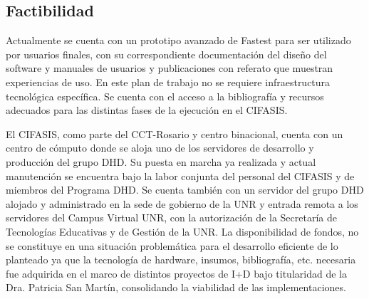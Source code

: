 \subsection{Factibilidad}
Actualmente se cuenta con un prototipo avanzado de Fastest para ser utilizado
por usuarios finales, con su correspondiente documentación del diseño del
software y  manuales de usuarios y publicaciones con referato que muestran
experiencias de uso. En este plan de trabajo no se requiere infraestructura
tecnológica específica. Se cuenta con  el acceso a la bibliografía y recursos
adecuados para las distintas fases de la ejecución en el CIFASIS.

El CIFASIS, como parte del CCT-Rosario y centro binacional, cuenta con un centro
de cómputo donde se aloja uno de los servidores de desarrollo y producción del
grupo DHD. Su puesta en marcha ya realizada y actual manutención se encuentra
bajo la labor conjunta del personal del CIFASIS y de miembros del Programa DHD.
Se cuenta también con un servidor del grupo DHD alojado y administrado en la
sede de gobierno de la UNR y entrada remota a los servidores del Campus Virtual
UNR, con la autorización de la Secretaría de Tecnologías Educativas y de Gestión
de la UNR. La disponibilidad de fondos, no se constituye en una situación
problemática para el desarrollo eficiente de lo planteado ya que la tecnología
de hardware,  insumos, bibliografía, etc.  necesaria fue adquirida en el marco
de distintos proyectos de I+D bajo titularidad de la Dra. Patricia San Martín,
consolidando la viabilidad de las implementaciones. 
